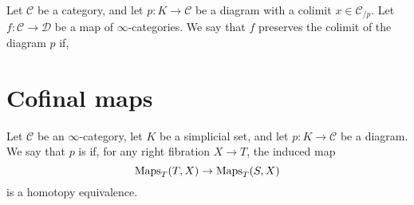 \documentclass[main.tex]{subfiles}
\begin{document}
Let $\mathcal{C}$ be a category, and let $p\colon K \to \mathcal{C}$ be a diagram with a colimit $x \in \mathcal{C}_{/p}$. Let $f\colon \mathcal{C} \to \mathcal{D}$ be a map of $\infty$-categories. We say that $f$ preserves the colimit of the diagram $p$ if,

\section{Cofinal maps}
\label{sec:cofinal_maps}

\begin{definition}
  \label{def:cofinal_map}
  Let $\mathcal{C}$ be an $\infty$-category, let $K$ be a simplicial set, and let $p\colon K \to \mathcal{C}$ be a diagram. We say that $p$ is  if, for any right fibration $X \to T$, the induced map
  \begin{equation*}
    \operatorname{Maps}_{T}(T, X) \to \operatorname{Maps}_{T}(S, X)
  \end{equation*}
  is a homotopy equivalence.
\end{definition}
\end{document}
